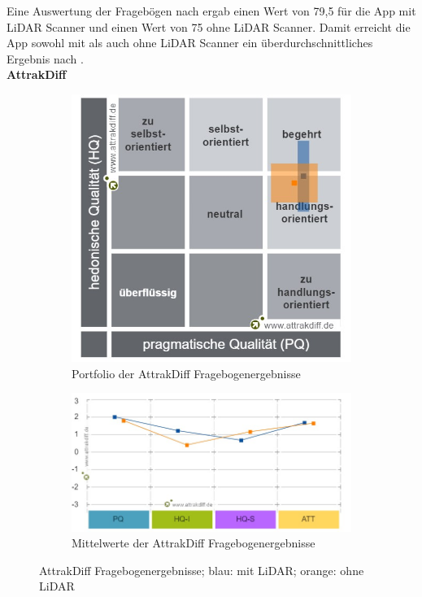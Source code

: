 \documentclass[titlepage, a4paper, 11pt]{scrartcl}
\begin{document}
      Eine Auswertung der Fragebögen nach \cite{SUS_Score} ergab einen Wert von 79,5 für die App mit LiDAR Scanner und einen Wert von 75 ohne LiDAR Scanner. 
      Damit erreicht die App sowohl mit als auch ohne LiDAR Scanner ein überdurchschnittliches Ergebnis nach \cite{SUS_Score}.\\

      \textbf{AttrakDiff}\\

      \begin{figure}
      \centering
      \begin{subfigure}{.5\textwidth}
        \centering
        \includegraphics[width=.9\linewidth]{AttrakDiff_Portfolio}
        \caption{Portfolio der AttrakDiff Fragebogenergebnisse}
        \label{AttrakDiff_P}
      \end{subfigure}%

      \begin{subfigure}{.5\textwidth}
        \centering
        \includegraphics[width=.9\linewidth]{AttrakDiff_Mittelwerte}
        \caption{Mittelwerte der AttrakDiff Fragebogenergebnisse}
        \label{AttrakDiff_M}
      \end{subfigure}

      \caption{AttrakDiff Fragebogenergebnisse; blau: mit LiDAR; orange: ohne LiDAR}
      \label{AttrakDiff}
      \end{figure}
\end{document}
